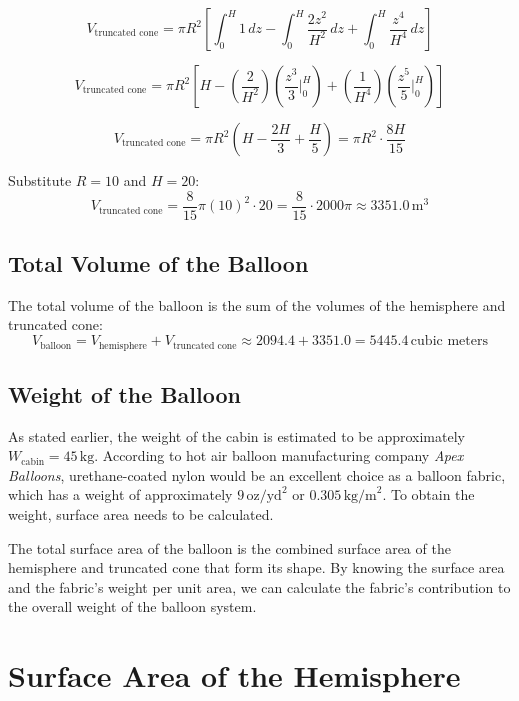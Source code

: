 \documentclass{article}
\begin{document}
\[
V_{\text{truncated cone}} = \pi R^2 \left[ \int_0^H 1 \, dz - \int_0^H \frac{2z^2}{H^2} \, dz + \int_0^H \frac{z^4}{H^4} \, dz \right]
\]

\[
V_{\text{truncated cone}} = \pi R^2 \left[ H - \left(\frac{2}{H^2}\right)\left(\frac{z^3}{3}\Big|_0^{H}\right) + \left(\frac{1}{H^4}\right) \left(\frac{z^5}{5}\Big|_0^{H}\right)\right]
\]


\[
V_{\text{truncated cone}} = \pi R^2 \left( H - \frac{2H}{3} + \frac{H}{5} \right) = \pi R^2 \cdot \frac{8H}{15}
\]

Substitute \( R = 10 \) and \( H = 20 \):
\[
V_{\text{truncated cone}} = \frac{8}{15} \pi (10)^2 \cdot 20 = \frac{8}{15} \cdot 2000 \pi \approx 3351.0 \, \text{m} ^3
\]

\subsection*{Total Volume of the Balloon}
The total volume of the balloon is the sum of the volumes of the hemisphere and truncated cone:
\[
V_{\text{balloon}} = V_{\text{hemisphere}} + V_{\text{truncated cone}} \approx 2094.4 + 3351.0 = 5445.4  \, \text{cubic meters} 
\]


\subsection*{Weight of the Balloon}

As stated earlier, the weight of the cabin is estimated to be approximately \( W_{\text{cabin}} = 45 \, \text{kg} \). According to hot air balloon manufacturing company \textit{Apex Balloons}, urethane-coated nylon would be an excellent choice as a balloon fabric, which has a weight of approximately \( 9 \, \text{oz/yd}^2 \) or \( 0.305 \, \text{kg/m}^2 \). To obtain the weight, surface area needs to be calculated.

The total surface area of the balloon is the combined surface area of the hemisphere and truncated cone that form its shape. By knowing the surface area and the fabric’s weight per unit area, we can calculate the fabric's contribution to the overall weight of the balloon system. 





\section*{Surface Area of the Hemisphere}
\end{document}
